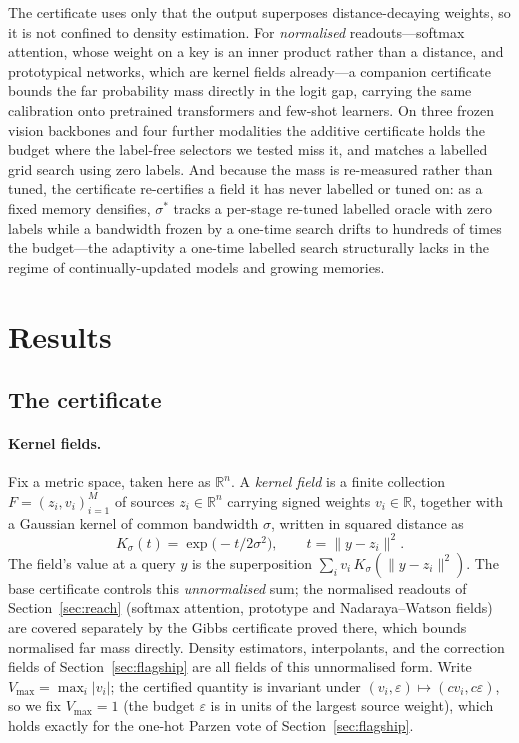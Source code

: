 \documentclass[10pt,twocolumn]{article}
\newcommand{\Ksig}{K_{\sigma}}
\newcommand{\sstar}{\sigma^{*}}
\newcommand{\Rbb}{\mathbb{R}}
\begin{document}
The certificate uses only that the output superposes distance-decaying weights, so it is not confined to density estimation. For \emph{normalised} readouts---softmax attention, whose weight on a key is an inner product rather than a distance, and prototypical networks, which are kernel fields already---a companion certificate bounds the far probability mass directly in the logit gap, carrying the same calibration onto pretrained transformers and few-shot learners. On three frozen vision backbones and four further modalities the additive certificate holds the budget where the label-free selectors we tested miss it, and matches a labelled grid search using zero labels. And because the mass is re-measured rather than tuned, the certificate re-certifies a field it has never labelled or tuned on: as a fixed memory densifies, $\sstar$ tracks a per-stage re-tuned labelled oracle with zero labels while a bandwidth frozen by a one-time search drifts to hundreds of times the budget---the adaptivity a one-time labelled search structurally lacks in the regime of continually-updated models and growing memories.

\section{Results}
\subsection{The certificate}\label{sec:cert}
\paragraph{Kernel fields.} Fix a metric space, taken here as $\Rbb^n$. A \emph{kernel field} is a finite collection $F=(z_i,v_i)_{i=1}^{M}$ of sources $z_i\in\Rbb^n$ carrying signed weights $v_i\in\Rbb$, together with a Gaussian kernel of common bandwidth $\sigma$, written in squared distance as
\begin{equation}
\Ksig(t)=\exp\!\big(-t/2\sigma^2\big),\qquad t=\lVert y-z_i\rVert^2 .
\end{equation}
The field's value at a query $y$ is the superposition $\sum_i v_i\,\Ksig(\lVert y-z_i\rVert^2)$. The base certificate controls this \emph{unnormalised} sum; the normalised readouts of Section~\ref{sec:reach} (softmax attention, prototype and Nadaraya--Watson fields) are covered separately by the Gibbs certificate proved there, which bounds normalised far mass directly. Density estimators, interpolants, and the correction fields of Section~\ref{sec:flagship} are all fields of this unnormalised form. Write $V_{\max}=\max_i|v_i|$; the certified quantity is invariant under $(v_i,\varepsilon)\mapsto(cv_i,c\varepsilon)$, so we fix $V_{\max}=1$ (the budget $\varepsilon$ is in units of the largest source weight), which holds exactly for the one-hot Parzen vote of Section~\ref{sec:flagship}.
\end{document}
